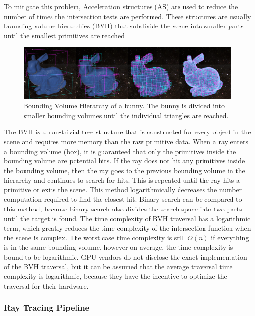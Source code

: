 \documentclass[12pt]{article}
\begin{document}
To mitigate this problem, Acceleration structures (AS) are used to reduce the number of times the intersection tests are performed.
These structures are usually bounding volume hierarchies (BVH) that subdivide the scene into smaller parts until the smallest primitives are reached \parencite{NVIDIA:Raytracing}.

\begin{figure}[H]
    \includegraphics[scale=0.22]{BVH-Visualization}
    \caption{
        Bounding Volume Hierarchy of a bunny.
        The bunny is divided into smaller bounding volumes until the individual triangles are reached.
        \parencite{Medium:BVH-Visualization}
    }
    \label{fig:BVH-Visualization}
\end{figure}

The BVH is a non-trivial tree structure that is constructed for every object in the scene and requires more memory than the raw primitive data.
When a ray enters a bounding volume (box), it is guaranteed that only the primitives inside the bounding volume are potential hits.
If the ray does not hit any primitives inside the bounding volume, then the ray goes to the previous bounding volume in the hierarchy and continues
to search for hits. This is repeated until the ray hits a primitive or exits the scene.
This method logarithmically decreases the number computation required to find the closest hit.
Binary search can be compared to this method, because binary search also divides the search space into two parts until the target is found.
The time complexity of BVH traversal has a logarithmic term, which greatly reduces the time complexity of the intersection function
when the scene is complex. The worst case time complexity is still $O(n)$ if everything is in the same bounding volume,
however on average, the time complexity is bound to be logarithmic. GPU vendors do not disclose the exact implementation of the BVH traversal,
but it can be assumed that the average traversal time complexity is logarithmic, because they
have the incentive to optimize the traversal for their hardware.

\subsubsection{Ray Tracing Pipeline}
\end{document}

